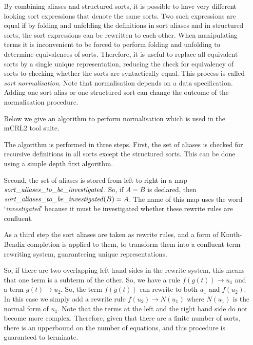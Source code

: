 \documentclass{article}
\begin{document}
By combining aliases and structured sorts, 
it is possible to have very different looking sort expressions that denote
the same sorts. Two such expressions are equal if by folding and unfolding the definitions in
sort aliases and in structured sorts, 
the sort expressions can be rewritten to each other. 
When manipulating terms it is inconvenient
to be forced to perform folding and unfolding to determine equivalences of sorts. Therefore, it
is useful to replace all equivalent sorts by a single unique representation, reducing the check
for equivalency of sorts to checking whether the sorts are syntactically equal. This process
is called {\it sort normalisation}. Note that normalisation depends on a data specification.
Adding one sort alias or one structured sort can change the outcome of the 
normalisation procedure. 


Below we give an algorithm to perform normalisation which is used in the mCRL2 tool suite.

The algorithm is performed in three steps.
First, the set of aliases is checked for recursive definitions
in all sorts except the structured sorts. This can be done using 
a simple depth first algorithm.
 
Second, the set of aliases is stored from left to
right in a map $\it sort\_aliases\_to\_be\_investigated$.
So, if $A=B$ is declared, then ${\it sort\_aliases\_to\_be\_investigated}(B)=A$.
The name of this map uses the word `{\it investigated}' because it
must be investigated whether these rewrite rules are confluent.

As a third step the sort aliases are taken as rewrite rules, and 
a form of Knuth-Bendix completion is applied to them, to transform them
into a confluent term rewriting system, guaranteeing unique representations.

So, if there are two overlapping left hand sides in the rewrite system, this
means that one term is a subterm of the other. So, we have a rule 
$f(g(t))\rightarrow u_1$ and a term $g(t)\rightarrow u_2$. So, the term
$f(g(t))$ can rewrite to both $u_1$ and $f(u_2)$. In this case we simply add
a rewrite rule $f(u_2)\rightarrow N(u_1)$ where $N(u_1)$ is the normal form
of $u_1$. Note that the terms at the left and
the right hand side do not become more complex. Therefore, given that there
are a finite number of sorts, there is an upperbound on the number of equations,
and this procedure is guaranteed to terminate.
\end{document}
